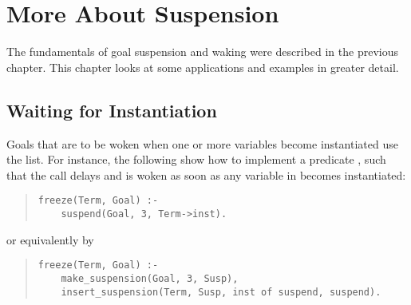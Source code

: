 %
%
%
%
%
%
%

\chapter{More About Suspension}

The fundamentals of goal suspension and waking were described in the
previous chapter.
This chapter looks at some applications and
examples in greater detail.

\section{Waiting for Instantiation}
Goals that are to be woken when one or more variables become
instantiated use the  list.
For instance, the following show how to implement a predicate
, such that the call 
delays and is woken as soon as any variable in 
becomes instantiated:

\begin{quote}
\begin{verbatim}
freeze(Term, Goal) :-
    suspend(Goal, 3, Term->inst).
\end{verbatim}
\end{quote}

or equivalently by
\begin{quote}
\begin{verbatim}
freeze(Term, Goal) :-
    make_suspension(Goal, 3, Susp),
    insert_suspension(Term, Susp, inst of suspend, suspend).
\end{verbatim}
\end{quote}

